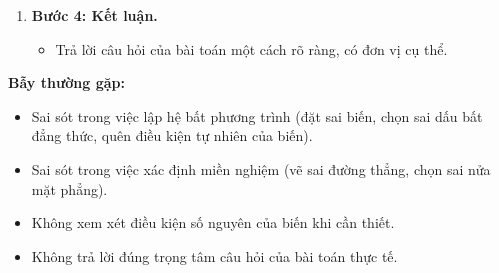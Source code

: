 \begin{phuongphap}
\begin{enumerate}
\begin{itemize}
        \item Nếu bài toán yêu cầu tìm giá trị lớn nhất hoặc nhỏ nhất của một biểu thức $F(x,y) = ax+by$, chuyển sang Dạng: Bài toán tối ưu hóa (tìm GTLN/GTNN) trên miền nghiệm.
    \end{itemize}
    \item \textbf{Bước 4: Kết luận.}
    \begin{itemize}
        \item Trả lời câu hỏi của bài toán một cách rõ ràng, có đơn vị cụ thể.
    \end{itemize}
\end{enumerate}
\textbf{Bẫy thường gặp:}
\begin{itemize}
    \item Sai sót trong việc lập hệ bất phương trình (đặt sai biến, chọn sai dấu bất đẳng thức, quên điều kiện tự nhiên của biến).
    \item Sai sót trong việc xác định miền nghiệm (vẽ sai đường thẳng, chọn sai nửa mặt phẳng).
    \item Không xem xét điều kiện số nguyên của biến khi cần thiết.
    \item Không trả lời đúng trọng tâm câu hỏi của bài toán thực tế.
\end{itemize}
\end{phuongphap}
